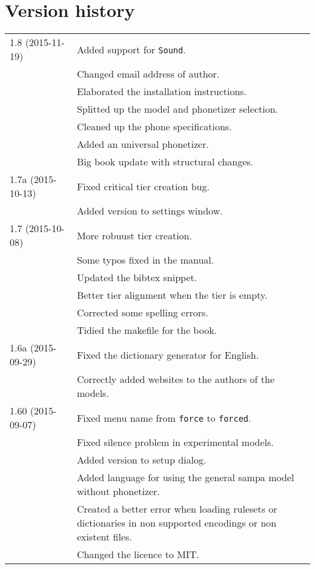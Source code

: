 \section{Version history}
\begin{longtable}{|p{0.22\linewidth}p{0.8\linewidth}|}
	\hline
	1.8 (2015-11-19) & \tabitem Added support for \texttt{Sound}.\\
		& \tabitem Changed email address of author.\\
		& \tabitem Elaborated the installation instructions.\\
		& \tabitem Splitted up the model and phonetizer selection.\\
		& \tabitem Cleaned up the phone specifications.\\
		& \tabitem Added an universal phonetizer.\\
		& \tabitem Big book update with structural changes.\\
	\hline
	1.7a (2015-10-13) & \tabitem Fixed critical tier creation bug.\\
	& \tabitem Added version to settings window.\\
	\hline
	1.7 (2015-10-08) & \tabitem More robuust tier creation.\\
		& \tabitem Some typos fixed in the manual.\\
		& \tabitem Updated the bibtex snippet.\\
		&	\tabitem Better tier alignment when the tier is empty.\\
		&	\tabitem Corrected some spelling errors.\\
		&	\tabitem Tidied the makefile for the book.\\
	\hline
	1.6a (2015-09-29) & \tabitem Fixed the dictionary generator for English.\\
		& \tabitem Correctly added websites to the authors of the models.\\
	\hline
	1.60 (2015-09-07) & \tabitem Fixed menu name from \texttt{force} to
\texttt{forced}.\\
		& \tabitem Fixed silence problem in experimental models.\\
		& \tabitem Added version to setup dialog.\\
		& \tabitem Added language for using the general sampa model without
			phonetizer.\\
		& \tabitem Created a better error when loading rulesets or dictionaries in
			non supported encodings or non existent files.\\
		& \tabitem Changed the licence to MIT.\\

\end{longtable}
